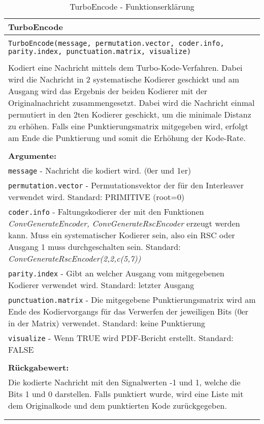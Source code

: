 \begin{longtable}{|p{\textwidth}|}
\hline
\rowcolor{lightblue}TurboEncode\\
\hline
\\
\texttt{TurboEncode(message, permutation.vector, coder.info, parity.index, punctuation.matrix, visualize)}\\
\\
Kodiert eine Nachricht mittels dem Turbo-Kode-Verfahren. Dabei wird die Nachricht in 2 systematische Kodierer geschickt und am Ausgang wird das Ergebnis der beiden Kodierer mit der Originalnachricht zusammengesetzt. Dabei wird die Nachricht einmal permutiert in den 2ten Kodierer geschickt, um die minimale Distanz zu erhöhen. Falls eine Punktierungsmatrix mitgegeben wird, erfolgt am Ende die Punktierung und somit die Erhöhung der Kode-Rate.\\
\\
\textbf{Argumente:}\\
\texttt{message} - Nachricht die kodiert wird. (0er und 1er)\\
\texttt{permutation.vector} - Permutationsvektor der für den Interleaver verwendet wird. Standard: PRIMITIVE (root=0)\\
\texttt{coder.info} - Faltungskodierer der mit den Funktionen \emph{ConvGenerateEncoder, ConvGenerateRscEncoder} erzeugt werden kann. Muss ein systematischer Kodierer sein, also ein RSC oder Ausgang 1 muss durchgeschalten sein. Standard: \emph{ConvGenerateRscEncoder(2,2,c(5,7))}\\
\texttt{parity.index} - Gibt an welcher Ausgang vom mitgegebenen Kodierer verwendet wird. Standard: letzter Ausgang\\
\texttt{punctuation.matrix} - Die mitgegebene Punktierungsmatrix wird am Ende des Kodiervorgangs für das Verwerfen der jeweiligen Bits (0er in der Matrix) verwendet. Standard: keine Punktierung\\
\texttt{visualize} - Wenn TRUE wird PDF-Bericht erstellt. Standard: FALSE\\
\\
\textbf{Rückgabewert:}\\
Die kodierte Nachricht mit den Signalwerten -1 und 1, welche die Bits 1 und 0 darstellen. Falls punktiert wurde, wird eine Liste mit dem Originalkode und dem punktierten Kode zurückgegeben.\\
\\
\hline
\caption{TurboEncode - Funktionserklärung}
\end{longtable}